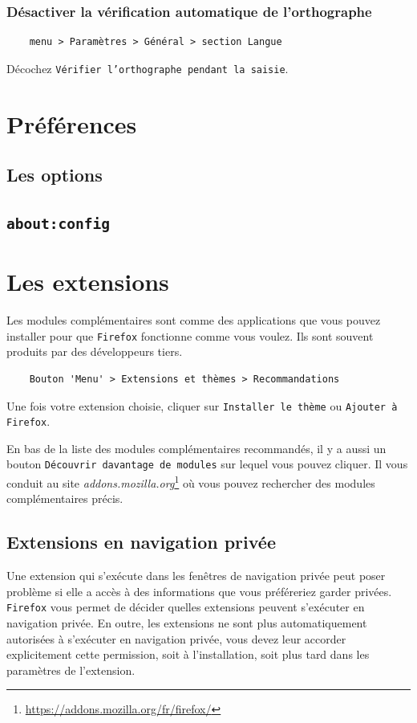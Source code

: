 \documentclass[a4paper,11pt]{book}
\begin{document}
\subsection*{Désactiver la vérification automatique de l’orthographe}
\begin{verbatim}
    menu > Paramètres > Général > section Langue 
\end{verbatim}
\medskip

Décochez \texttt{Vérifier l’orthographe pendant la saisie}.
\medskip

\chapter{Préférences}
\section{Les options}
\section{\texttt{about:config}}

\chapter{Les extensions}
Les modules complémentaires sont comme des applications que vous pouvez installer pour que \texttt{Firefox} fonctionne comme vous voulez. Ils sont souvent produits par des développeurs tiers.
\begin{verbatim}
    Bouton 'Menu' > Extensions et thèmes > Recommandations
\end{verbatim}
\medskip

Une fois votre extension choisie, cliquer sur \texttt{Installer le thème} ou \texttt{Ajouter à Firefox}.
\medskip

En bas de la liste des modules complémentaires recommandés, il y a aussi un bouton \texttt{Découvrir davantage de modules} sur lequel vous pouvez cliquer. Il vous conduit au site \textit{addons.mozilla.org}\footnote{\url{https://addons.mozilla.org/fr/firefox/}} où vous pouvez rechercher des modules complémentaires précis. 
\medskip

\section{Extensions en navigation privée}
Une extension qui s’exécute dans les fenêtres de navigation privée peut poser problème si elle a accès à des informations que vous préféreriez garder privées. \texttt{Firefox} vous permet de décider quelles extensions peuvent s’exécuter en navigation privée. En outre, les extensions ne sont plus automatiquement autorisées à s’exécuter en navigation privée, vous devez leur accorder explicitement cette permission, soit à l’installation, soit plus tard dans les paramètres de l’extension.
\medskip
\end{document}

